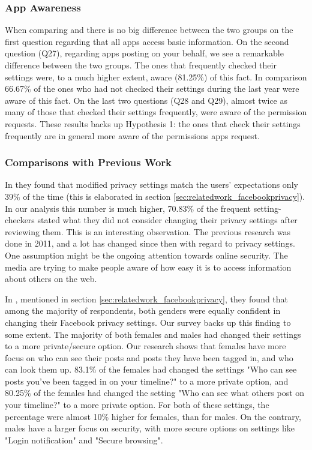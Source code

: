 \subsubsection{App Awareness}
When comparing  and  there is no big difference between the two groups on the first question regarding that all apps access basic information. On the second question (Q27), regarding apps posting on your behalf, we see a remarkable difference between the two groups. The ones that frequently checked their settings were, to a much higher extent, aware (81.25\%) of this fact. In comparison 66.67\% of the ones who had not checked their settings during the last year were aware of this fact. On the last two questions (Q28 and Q29), almost twice as many of those that checked their settings frequently, were aware of the permission requests. These results backs up Hypothesis 1: the ones that check their settings frequently are in general more aware of the permissions apps request.

\subsubsection{Comparisons with Previous Work} 
In \cite{expectations} they found that modified privacy settings match the users' expectations only 39\% of the time (this is elaborated in section \ref{sec:relatedwork_facebookprivacy}). In our analysis this number is much higher, 70.83\% of the frequent setting-checkers stated what they did not consider changing their privacy settings after reviewing them. This is an interesting observation. The previous research was done in 2011, and a lot has changed since then with regard to privacy settings. One assumption might be the ongoing attention towards online security. The media are trying to make people aware of how easy it is to access information about others on the web. 

In \cite{whocares}, mentioned in section \ref{sec:relatedwork_facebookprivacy}, they found that among the majority of respondents, both genders were equally confident in changing their Facebook privacy settings. Our survey backs up this finding to some extent. The majority of both females and males had changed their settings to a more private/secure option. Our research shows that females have more focus on who can see their posts and posts they have been tagged in, and who can look them up. 83.1\% of the females had changed the settings "Who can see posts you've been tagged in on your timeline?" to a more private option, and 80.25\% of the females had changed the setting "Who can see what others post on your timeline?" to a more private option. For both of these settings, the percentage were almost 10\% higher for females, than for males. On the contrary, males have a larger focus on security, with more secure options on settings like "Login notification" and "Secure browsing". 




